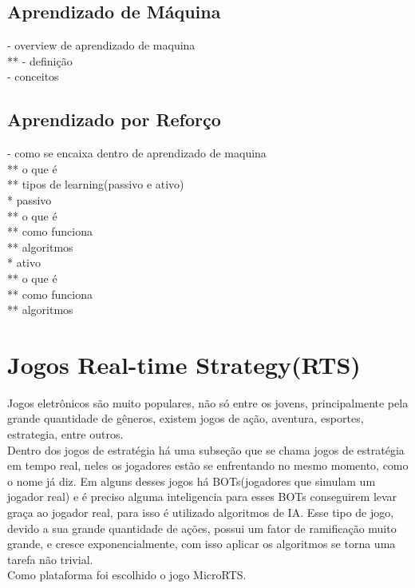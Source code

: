 \subsection{Aprendizado de Máquina} 
- overview de aprendizado de maquina \\
**
- definição \\
- conceitos

\subsection{Aprendizado por Reforço} 
- como se encaixa dentro de aprendizado de maquina \\
** o que é \\
** tipos de learning(passivo e ativo) \\
* passivo \\
** o que é \\
** como funciona \\
** algoritmos \\
* ativo \\
** o que é \\
** como funciona \\
** algoritmos \\


\section{Jogos Real-time Strategy(RTS)} 

Jogos eletrônicos são muito populares, não só entre os jovens, principalmente pela grande quantidade de gêneros, existem jogos de ação, aventura, esportes, estrategia, entre outros. \\
Dentro dos jogos de estratégia há uma subseção que se chama jogos de estratégia em tempo real, neles os jogadores estão se enfrentando no mesmo momento, como o nome já diz. Em alguns desses jogos há BOTs(jogadores que simulam um jogador real) e é preciso alguma inteligencia para esses BOTs conseguirem levar graça ao jogador real, para isso é utilizado algoritmos de IA. Esse tipo de jogo, devido a sua grande quantidade de ações, possui um fator de ramificação muito grande, e cresce exponencialmente, com isso aplicar os algoritmos se torna uma tarefa não trivial.  \\
Como plataforma foi escolhido o jogo MicroRTS. 

